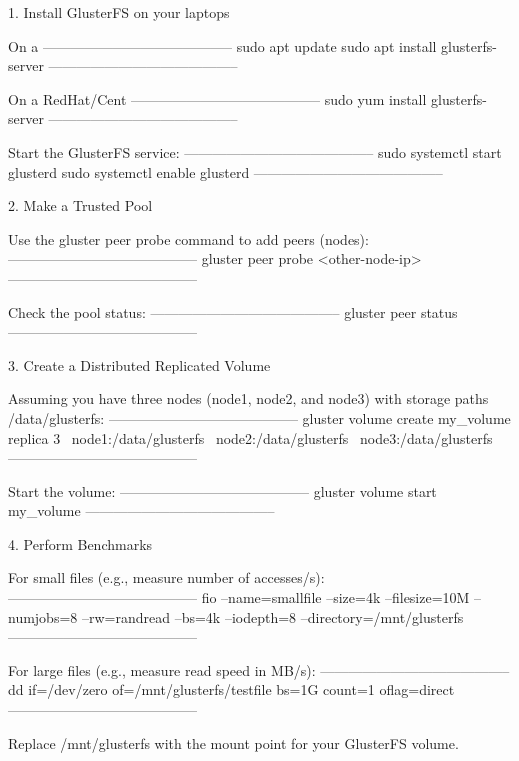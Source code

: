 1. Install GlusterFS on your laptops

On a
-----------------------------------------
sudo apt update
sudo apt install glusterfs-server
-----------------------------------------

On a RedHat/Cent
-----------------------------------------
sudo yum install glusterfs-server
-----------------------------------------

Start the GlusterFS service:
-----------------------------------------
sudo systemctl start glusterd
sudo systemctl enable glusterd
-----------------------------------------

2. Make a Trusted Pool

Use the gluster peer probe command to add peers (nodes):
-----------------------------------------
gluster peer probe <other-node-ip>
-----------------------------------------

Check the pool status:
-----------------------------------------
gluster peer status
-----------------------------------------

3. Create a Distributed Replicated Volume

Assuming you have three nodes (node1, node2, and node3) with storage paths /data/glusterfs:
-----------------------------------------
gluster volume create my_volume replica 3 \
node1:/data/glusterfs \
node2:/data/glusterfs \
node3:/data/glusterfs
-----------------------------------------

Start the volume:
-----------------------------------------
gluster volume start my_volume
-----------------------------------------

4. Perform Benchmarks

For small files (e.g., measure number of accesses/s):
-----------------------------------------
fio --name=smallfile --size=4k --filesize=10M --numjobs=8 --rw=randread --bs=4k --iodepth=8 --directory=/mnt/glusterfs
-----------------------------------------

For large files (e.g., measure read speed in MB/s):
-----------------------------------------
dd if=/dev/zero of=/mnt/glusterfs/testfile bs=1G count=1 oflag=direct
-----------------------------------------

Replace /mnt/glusterfs with the mount point for your GlusterFS volume.
